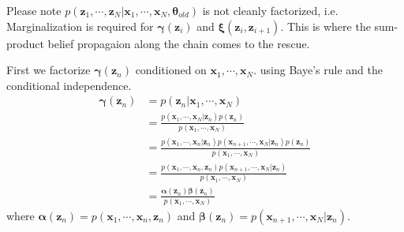 \documentclass[a4]{article}
\begin{document}
Please note $p(\bm{z}_1, \cdots, \bm{z}_N |\bm{x}_1, \cdots, \bm{x}_N, \bm{\theta}_{old})$ is not cleanly factorized,
i.e. Marginalization is required for 
$\bm{\gamma}(\bm{z}_i)$ and $\bm{\xi}(\bm{z}_i, \bm{z}_{i+1})$.
This is where the sum-product belief propagaion along the chain comes to the rescue.

First we factorize $\bm{\gamma}(\bm{z}_n)$ conditioned on $\bm{x}_1, \cdots, \bm{x}_N$.
using Baye's rule and the conditional independence.
\begin{equation}
\begin{aligned}
\bm{\gamma}(\bm{z}_n) &= p(\bm{z}_n|\bm{x}_1, \cdots, \bm{x}_N)\\
&= \frac{
    p(\bm{x}_1, \cdots, \bm{x}_N | \bm{z}_n) p(\bm{z}_n)
}
{
    p(\bm{x}_1, \cdots, \bm{x}_N)
}\\
&= \frac{
    p(\bm{x}_1, \cdots, \bm{x}_n | \bm{z}_n)
    p(\bm{x}_{n+1}, \cdots, \bm{x}_N | \bm{z}_n)p(\bm{z}_n)
}
{
    p(\bm{x}_1, \cdots, \bm{x}_N)
}\\
&= \frac{
    p(\bm{x}_1, \cdots, \bm{x}_n, \bm{z}_n)
    p(\bm{x}_{n+1}, \cdots, \bm{x}_N | \bm{z}_n)
}
{
    p(\bm{x}_1, \cdots, \bm{x}_N)
}\\
&= \frac{
    \bm{\alpha}(\bm{z}_n)
    \bm{\beta}(\bm{z}_n)
}
{
    p(\bm{x}_1, \cdots, \bm{x}_N)
}
\end{aligned}
\end{equation}
where 
$\bm{\alpha}(\bm{z}_n) = p(\bm{x}_1, \cdots, \bm{x}_n, \bm{z}_n)$
and 
$\bm{\beta}(\bm{z}_n) = p(\bm{x}_{n+1}, \cdots, \bm{x}_N | \bm{z}_n)$.
\end{document}
